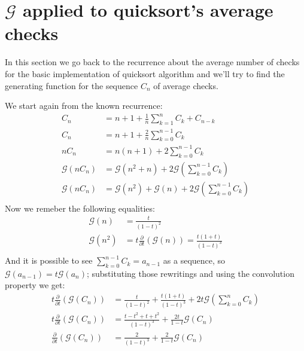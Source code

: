
\section{$\mathcal{G}$ applied to quicksort's average checks }
In this section we go back to the recurrence about the average number
of checks for the basic implementation of quicksort algorithm and
we'll try to find the generating function for the sequence $C_n$ of
average checks.

We start again from the known recurrence:
\begin{displaymath}
  \begin{split}
    C_n &= n+1 +  \frac{1}{n}\sum_{k=1}^{n}{C_k + C_{n-k}}  \\
    C_n &= n+1 +  \frac{2}{n}\sum_{k=0}^{n-1}{C_k}  \\
    nC_n &= n(n+1) + 2\sum_{k=0}^{n-1}{C_k}  \\
    \mathcal{G} (nC_n) &= \mathcal{G} (n^2+n) +
    2\mathcal{G} \left(\sum_{k=0}^{n-1}{C_k} \right) \\
    \mathcal{G} (nC_n) &= \mathcal{G} (n^2) +\mathcal{G} (n) +
    2\mathcal{G} \left(\sum_{k=0}^{n-1}{C_k} \right) \\
  \end{split}
\end{displaymath}
Now we remeber the following equalities:
\begin{displaymath}
  \begin{split}
    \mathcal{G} (n) &=  \frac{t}{(1-t)^2} \\
    \mathcal{G} (n^2) &=
    t\frac{\partial}{\partial t}(\mathcal{G} (n)) =
    \frac{t(1+t)}{(1-t)^3} \\
  \end{split}
\end{displaymath}
And it is possible to see $\sum_{k=0}^{n-1}{C_k} = a_{n-1}$ as a
sequence, so $\mathcal{G} (a_{n-1}) = t \mathcal{G} (a_n)$;
substituting those rewritings and using the convolution property we
get:
\begin{displaymath}
  \begin{split}
    t \frac{\partial}{\partial t}\left( \mathcal{G} (C_n) \right) &=
    \frac{t}{(1-t)^2} + \frac{t(1+t)}{(1-t)^3} + 2t\mathcal{G}
    \left(\sum_{k=0}^{n}{C_k} \right)\\
    t \frac{\partial}{\partial t}\left( \mathcal{G} (C_n) \right) &=
    \frac{t -t^2+ t+t^2}{(1-t)^3} + \frac{2t}{1-t} \mathcal{G}
    \left(C_n \right)\\
    \frac{\partial}{\partial t}\left( \mathcal{G} (C_n) \right) &=
    \frac{2}{(1-t)^3} + \frac{2}{1-t} \mathcal{G}
    \left(C_n \right)\\
  \end{split}
\end{displaymath}
